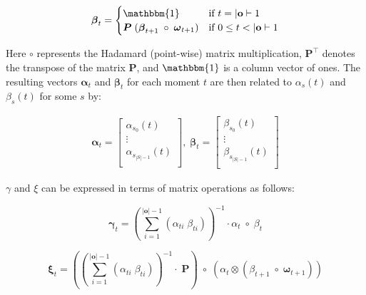 \begin{equation}
    \label{eq:beta}
    \boldsymbol{\beta}_t =
    \begin{cases}
        \mathbbm{1} & \text{if } t = |\mathbf{o}|-1        \\
        \boldsymbol{P} \; (\boldsymbol{\beta}_{t + 1} \; \circ \; \boldsymbol{\omega}_{t + 1}) & \text{if } 0 \leq t < |\mathbf{o}|-1 \\
    \end{cases}
\end{equation}

Here $\circ$ represents the Hadamard (point-wise) matrix multiplication, $\boldsymbol{P}^\top$ denotes the transpose of the matrix $\boldsymbol{P}$, and $\mathbbm{1}$ is a column vector of ones.
The resulting vectors $\boldsymbol{\alpha}_t$ and $\boldsymbol{\beta}_t$ for each moment $t$ are then related to $\alpha_s(t)$ and $\beta_s(t)$ for some $s$ by:

\begin{align}
    \boldsymbol{\alpha}_t = \begin{bmatrix}
                                \alpha_{s_0}(t)       \\
                                \vdots                \\
                                \alpha_{s_{|S|-1}}(t) \\
    \end{bmatrix}, \;
    \boldsymbol{\beta}_t = \begin{bmatrix}
                               \beta_{s_0}(t)       \\
                               \vdots               \\
                               \beta_{s_{|S|-1}}(t) \\
    \end{bmatrix}
\end{align}

$\gamma$ and $\xi$ can be expressed in terms of matrix operations as follows:

\begin{equation}
    \boldsymbol{\gamma}_t = (\sum_{i=1}^{|\mathbf{o}|-1} (\alpha_{t i} \;\beta_{t i}))^{-1} \cdot \alpha_t \; \circ \; \beta_t
    \label{eq:gamma-matrix}
\end{equation}

\begin{equation}
    \boldsymbol{\xi}_t = ((\sum_{i=1}^{|\mathbf{o}|-1} (\alpha_{t i} \; \beta_{t i}))^{-1} \cdot \; \boldsymbol{P}) \; \circ \;(\alpha_t \otimes (\beta_{t+1} \; \circ \; \boldsymbol{\omega}_{t+1}))
    \label{eq:xi-matrix}
\end{equation}

